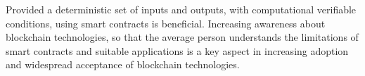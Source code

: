 \documentclass[12pt,tightenlines,letterpaper]{scrartcl}
\begin{document}
	Provided a deterministic set of inputs and outputs, with computational verifiable conditions, using smart contracts is beneficial. Increasing awareness about \gls{blockchain} technologies, so that the average person understands the limitations of smart contracts and suitable applications is a key aspect in increasing adoption and widespread acceptance of \gls{blockchain} technologies.
	
	

\renewcommand\bibname{References} %

\newpage 
 \printbibliography
 
\linespread{1}
\end{document}
